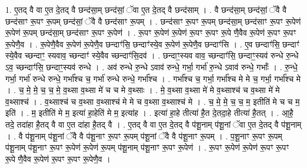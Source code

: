 \documentclass[17pt]{extarticle}
\begin{document}
1. ए॒तद् वै वा ए॒त दे॒तद् वै छन्द॑सा॒म् छन्द॑सां॒ ॅवा ए॒त दे॒तद् वै छन्द॑साम् । . वै छन्द॑सा॒म् छन्द॑सां॒ ॅवै वै छन्द॑साꣳ रू॒पꣳ रू॒पम् छन्द॑सां॒ ॅवै वै छन्द॑साꣳ रू॒पम् । . छन्द॑साꣳ रू॒पꣳ रू॒पम् छन्द॑सा॒म् छन्द॑साꣳ रू॒पꣳ रू॒पेण॑ रू॒पेण॑ रू॒पम् छन्द॑सा॒म् छन्द॑साꣳ रू॒पꣳ रू॒पेण॑ । . रू॒पꣳ रू॒पेण॑ रू॒पेण॑ रू॒पꣳ रू॒पꣳ रू॒पे णै॒वैव रू॒पेण॑ रू॒पꣳ रू॒पꣳ रू॒पेणै॒व । . रू॒पेणै॒वैव रू॒पेण॑ रू॒पेणै॒व छन्दाꣳ॑सि॒ छन्दाꣳ॑स्ये॒व रू॒पेण॑ रू॒पेणै॒व छन्दाꣳ॑सि । . ए॒व छन्दाꣳ॑सि॒ छन्दाꣳ॑ स्ये॒वैव च्छन्दाꣳ॒ स्यवाव॒ च्छन्दाꣳ॑ स्ये॒वैव च्छन्दाꣳ॑सि॒दव॑ । . छन्दाꣳ॒स्यव वाव॒ च्छन्दाꣳ॑सि॒ छन्दाꣳ॒स्यव॑ रुन्धे रु॒न्धे ऽव॒ च्छन्दाꣳ॑सि॒ 
छन्दाꣳ॒स्यव॑ रुन्धे । . अव॑ रुन्धे रु॒न्धे ऽवाव॑ रुन्धे॒ गर्भा॒ गर्भा॑ रु॒न्धे ऽवाव॑ रुन्धे॒ गर्भाः᳚ । . रु॒न्धे॒ गर्भा॒ गर्भा॑ रुन्धे रुन्धे॒ गर्भा᳚श्च च॒ गर्भा॑ रुन्धे रुन्धे॒ गर्भा᳚श्च । . गर्भा᳚श्च च॒ गर्भा॒ गर्भा᳚श्च मे मे च॒ गर्भा॒ गर्भा᳚श्च मे । . च॒ मे॒ मे॒ च॒ च॒ मे॒ व॒थ्सा व॒थ्सा मे॑ च च मे व॒थ्साः । . मे॒ व॒थ्सा व॒थ्सा मे॑ मे व॒थ्साश्च॑ च व॒थ्सा मे॑ मे व॒थ्साश्च॑ । . व॒थ्साश्च॑ च व॒थ्सा व॒थ्साश्च॑ मे मे च व॒थ्सा व॒थ्साश्च॑ मे । . च॒ मे॒ मे॒ च॒ च॒ म॒ इतीति॑ मे च च म॒ इति॑ । . म॒ इतीति॑ मे म॒ इत्या॑ हा॒हेति॑ मे म॒ इत्या॑ह । . इत्या॑ हा॒हे तीत्या॑ है॒त दे॒तदा॒हे तीत्या॑ है॒तत् । . आ॒है॒ तदे॒ तदा॑हा है॒तद् वै वा ए॒त दा॑हा है॒तद् वै । . ए॒तद् वै वा ए॒त दे॒तद् वै प॑शू॒नाम् प॑शू॒नां ॅवा ए॒त दे॒तद् वै प॑शू॒नाम् । . वै प॑शू॒नाम् प॑शू॒नां ॅवै वै प॑शू॒नाꣳ रू॒पꣳ रू॒पम् प॑शू॒नां ॅवै वै प॑शू॒नाꣳ रू॒पम् । . प॒शू॒नाꣳ रू॒पꣳ रू॒पम् प॑शू॒नाम् प॑शू॒नाꣳ रू॒पꣳ रू॒पेण॑ रू॒पेण॑ रू॒पम् प॑शू॒नाम् प॑शू॒नाꣳ रू॒पꣳ रू॒पेण॑ । . रू॒पꣳ रू॒पेण॑ रू॒पेण॑ रू॒पꣳ रू॒पꣳ रू॒पे णै॒वैव रू॒पेण॑ रू॒पꣳ रू॒पꣳ रू॒पेणै॒व । \newline
\end{document}
